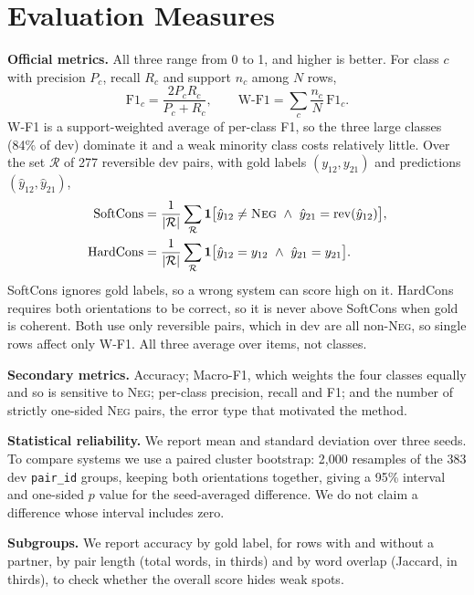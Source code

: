 \documentclass[10pt,a4paper,twocolumn]{article}
\newcommand{\Neg}{\textsc{Neg}}
\begin{document}
\section{Evaluation Measures}
\label{sec:eval}

\textbf{Official metrics.} All three range from 0 to 1, and higher is better. For class $c$ with precision $P_c$, recall $R_c$ and support $n_c$ among $N$ rows,
\begin{equation}
\mathrm{F1}_c=\frac{2P_cR_c}{P_c+R_c},\qquad \text{W-F1}=\sum_{c}\frac{n_c}{N}\,\mathrm{F1}_c .
\end{equation}
W-F1 is a support-weighted average of per-class F1, so the three large classes (84\% of dev) dominate it and a weak minority class costs relatively little. Over the set $\mathcal{R}$ of 277 reversible dev pairs, with gold labels $(y_{12},y_{21})$ and predictions $(\hat y_{12},\hat y_{21})$,
\begin{align}
\text{SoftCons}&=\frac{1}{|\mathcal{R}|}\sum_{\mathcal{R}}\mathbf{1}\big[\hat y_{12}\neq\Neg\ \wedge\ \hat y_{21}=\mathrm{rev}(\hat y_{12})\big],\\
\text{HardCons}&=\frac{1}{|\mathcal{R}|}\sum_{\mathcal{R}}\mathbf{1}\big[\hat y_{12}=y_{12}\ \wedge\ \hat y_{21}=y_{21}\big].
\end{align}
SoftCons ignores gold labels, so a wrong system can score high on it. HardCons requires both orientations to be correct, so it is never above SoftCons when gold is coherent. Both use only reversible pairs, which in dev are all non-\Neg, so single rows affect only W-F1. All three average over items, not classes.

\textbf{Secondary metrics.} Accuracy; Macro-F1, which weights the four classes equally and so is sensitive to \Neg; per-class precision, recall and F1; and the number of strictly one-sided \Neg{} pairs, the error type that motivated the method.

\textbf{Statistical reliability.} We report mean and standard deviation over three seeds. To compare systems we use a paired cluster bootstrap: 2,000 resamples of the 383 dev \texttt{pair\_id} groups, keeping both orientations together, giving a 95\% interval and one-sided $p$ value for the seed-averaged difference. We do not claim a difference whose interval includes zero.

\textbf{Subgroups.} We report accuracy by gold label, for rows with and without a partner, by pair length (total words, in thirds) and by word overlap (Jaccard, in thirds), to check whether the overall score hides weak spots.
\end{document}
